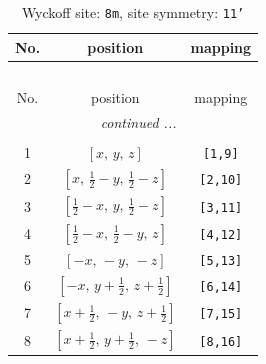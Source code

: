 \documentclass[fleqn,8pt]{jsarticle}
\begin{document}
\renewcommand{\arraystretch}{1.2}
\begin{longtable}{ccc}
\caption{Wyckoff site: {\tt 8m}, site symmetry: {\tt 11'}}
 \\
 \hline \hline
No. & position & mapping \\ \hline \endfirsthead

\multicolumn{2}{l}{\tablename\ \thetable{}} \\
 \hline \hline
No. & position & mapping \\ \hline \endhead

 \hline \hline
\multicolumn{2}{r}{\footnotesize\it continued ...} \\ \endfoot

 \hline \hline
\multicolumn{2}{r}{} \\ \endlastfoot

1 & $\left[ x,\, y,\, z \right]$ & {\tt [1,9]} \\ \hline
2 & $\left[ x,\, \frac{1}{2} - y,\, \frac{1}{2} - z \right]$ & {\tt [2,10]} \\ \hline
3 & $\left[ \frac{1}{2} - x,\, y,\, \frac{1}{2} - z \right]$ & {\tt [3,11]} \\ \hline
4 & $\left[ \frac{1}{2} - x,\, \frac{1}{2} - y,\, z \right]$ & {\tt [4,12]} \\ \hline
5 & $\left[ - x,\, - y,\, - z \right]$ & {\tt [5,13]} \\ \hline
6 & $\left[ - x,\, y + \frac{1}{2},\, z + \frac{1}{2} \right]$ & {\tt [6,14]} \\ \hline
7 & $\left[ x + \frac{1}{2},\, - y,\, z + \frac{1}{2} \right]$ & {\tt [7,15]} \\ \hline
8 & $\left[ x + \frac{1}{2},\, y + \frac{1}{2},\, - z \right]$ & {\tt [8,16]} \\
\end{longtable}
\end{document}
